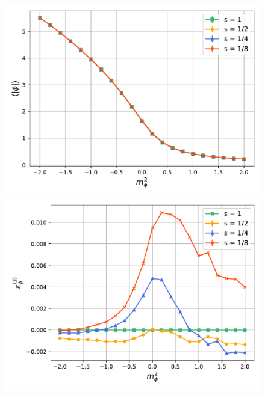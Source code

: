\begin{figure}
    \centering
    \begin{minipage}{0.45\textwidth}
        \includegraphics[scale=0.45]{figures/cooling/mass_scan/magnetisation.pdf}
    \end{minipage}
    \hfill 
    \begin{minipage}{0.45\textwidth}
        \includegraphics[scale=0.45]{figures/cooling/mass_scan/deviation.pdf}
    \end{minipage}
    \label{fig:cooling}
\end{figure}
